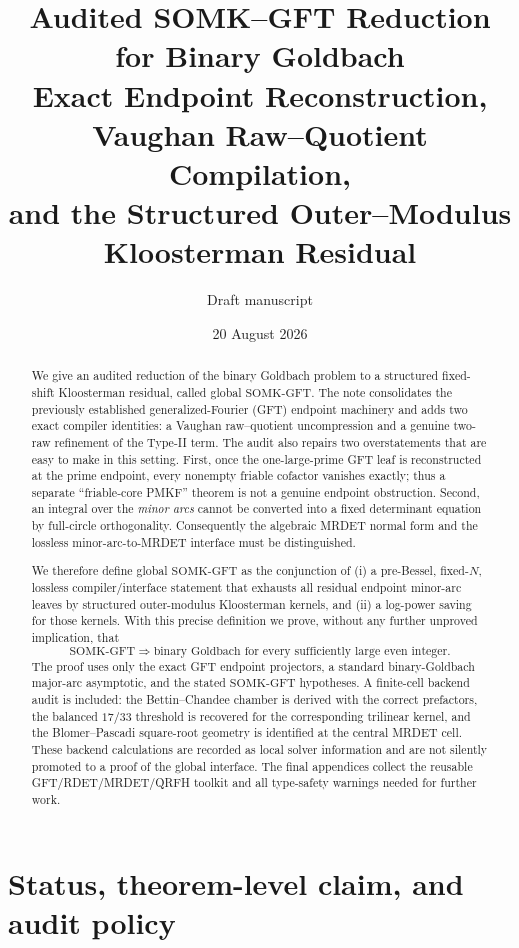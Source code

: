 \documentclass[11pt]{article}
\title{\textbf{Audited SOMK--GFT Reduction for Binary Goldbach}\\
\large Exact Endpoint Reconstruction, Vaughan Raw--Quotient Compilation,\\
and the Structured Outer--Modulus Kloosterman Residual}
\author{Draft manuscript}
\date{20 August 2026}
\theoremstyle{definition}
\theoremstyle{remark}
\newcommand{\1}{\mathbf 1}
\newcommand{\SOMK}{\mathrm{SOMK}\text{-}\mathrm{GFT}}
\begin{document}
\maketitle

\begin{abstract}
We give an audited reduction of the binary Goldbach problem to a structured fixed-shift Kloosterman residual, called global \(\SOMK\).  The note consolidates the previously established generalized-Fourier (GFT) endpoint machinery and adds two exact compiler identities: a Vaughan raw--quotient uncompression and a genuine two-raw refinement of the Type-II term.  The audit also repairs two overstatements that are easy to make in this setting.  First, once the one-large-prime GFT leaf is reconstructed at the prime endpoint, every nonempty friable cofactor vanishes exactly; thus a separate ``friable-core PMKF'' theorem is not a genuine endpoint obstruction.  Second, an integral over the \emph{minor arcs} cannot be converted into a fixed determinant equation by full-circle orthogonality.  Consequently the algebraic MRDET normal form and the lossless minor-arc-to-MRDET interface must be distinguished.

We therefore define global \(\SOMK\) as the conjunction of (i) a pre-Bessel, fixed-\(N\), lossless compiler/interface statement that exhausts all residual endpoint minor-arc leaves by structured outer-modulus Kloosterman kernels, and (ii) a log-power saving for those kernels.  With this precise definition we prove, without any further unproved implication, that
\[
 \boxed{\SOMK\Longrightarrow \text{binary Goldbach for every sufficiently large even integer}.}
\]
The proof uses only the exact GFT endpoint projectors, a standard binary-Goldbach major-arc asymptotic, and the stated \(\SOMK\) hypotheses.  A finite-cell backend audit is included: the Bettin--Chandee chamber is derived with the correct prefactors, the balanced \(17/33\) threshold is recovered for the corresponding trilinear kernel, and the Blomer--Pascadi square-root geometry is identified at the central MRDET cell.  These backend calculations are recorded as local solver information and are not silently promoted to a proof of the global interface.  The final appendices collect the reusable GFT/RDET/MRDET/QRFH toolkit and all type-safety warnings needed for further work.
\end{abstract}

\tableofcontents

\section{Status, theorem-level claim, and audit policy}
\end{document}
